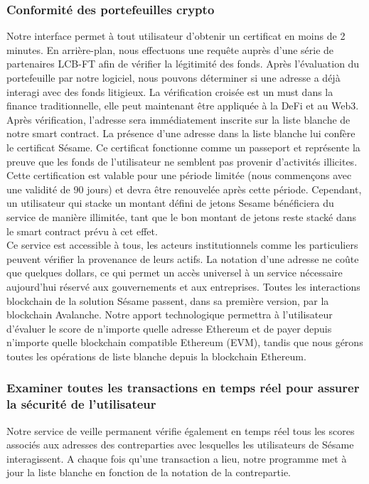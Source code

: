 ﻿\documentclass[a4paper]{article}
\begin{document}
\subsubsection{Conformité des portefeuilles crypto}
Notre interface permet à tout utilisateur d'obtenir un certificat en moins de 2 minutes. En arrière-plan, nous effectuons une requête auprès d'une série de partenaires LCB-FT afin de vérifier la légitimité des fonds. Après l'évaluation du portefeuille par notre logiciel, nous pouvons déterminer si une adresse a déjà interagi avec des fonds litigieux. La vérification croisée est un must dans la finance traditionnelle, elle peut maintenant être appliquée à la DeFi et au Web3. 
Après vérification, l'adresse sera immédiatement inscrite sur la liste blanche de notre smart contract. La présence d'une adresse dans la liste blanche lui confère le certificat Sésame. Ce certificat fonctionne comme un passeport et représente la preuve que les fonds de l'utilisateur ne semblent pas provenir d'activités illicites. Cette certification est valable pour une période limitée (nous commençons avec une validité de 90 jours) et devra être renouvelée après cette période. Cependant, un utilisateur qui stacke un montant défini de jetons Sesame bénéficiera du service de manière illimitée, tant que le bon montant de jetons reste stacké dans le smart contract prévu à cet effet. \\

Ce service est accessible à tous, les acteurs institutionnels comme les particuliers peuvent vérifier la provenance de leurs actifs. La notation d'une adresse ne coûte que quelques dollars, ce qui permet un accès universel à un service nécessaire aujourd'hui réservé aux gouvernements et aux entreprises. Toutes les interactions blockchain de la solution Sésame passent, dans sa première version, par la blockchain Avalanche. Notre apport technologique permettra à l'utilisateur d’évaluer le score de n'importe quelle adresse Ethereum et de payer depuis n'importe quelle blockchain compatible Ethereum (EVM), tandis que nous gérons toutes les opérations de liste blanche depuis la blockchain Ethereum. 

\subsubsection{Examiner toutes les transactions en temps réel pour assurer la sécurité de l’utilisateur} 
Notre service de veille permanent vérifie également en temps réel tous les scores associés aux adresses des contreparties avec lesquelles les utilisateurs de Sésame interagissent. A chaque fois qu’une transaction a lieu, notre programme met à jour la liste blanche en fonction de la notation de la contrepartie. \\
\end{document}
